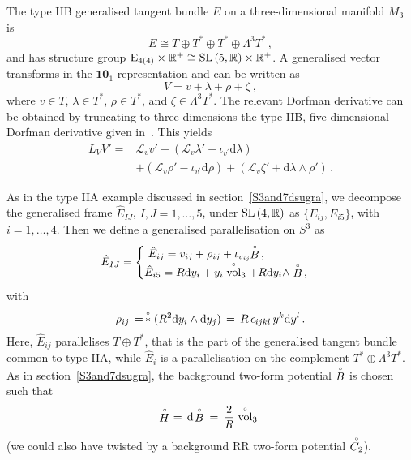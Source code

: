 \documentclass[debug]{phd}
\begin{document}
The type IIB generalised tangent bundle $E$ on a three-dimensional manifold $M_3$ is
\begin{equation}
\label{gb}
E \cong T \oplus T^* \oplus T^* \oplus \Lambda^3 T^*\, ,
\end{equation}
and has structure group $\mathrm{E}_{4(4)} \times \mathbb{R}^+\cong \mathrm{SL}\left(5,\mathbb{R}\right)\times \mathbb{R}^+$.
A generalised vector transforms in the $\mathbf{10}_1$ representation and can be written as
\begin{equation*}
V = v + \lambda + \rho + \zeta\ ,
\end{equation*}
where $v\in T$, $\lambda \in T^*$, $\rho \in T^*$, and $\zeta\in \Lambda^3 T^*$.
The relevant Dorfman derivative can be obtained by truncating to three dimensions the type IIB, five-dimensional Dorfman derivative given in~\cite{spheres,AshmoreECY}. This yields
\begin{equation}
\label{dorfb3}
\begin{split}
L_V V' =& \mathcal{L}_v v' + \left(\mathcal{L}_v \lambda' - \iota_{v^\prime} \mathrm{d}\lambda \right) \\
& + \left(\mathcal{L}_v \rho' - \iota_{v^\prime} \mathrm{d}\rho \right) + \left(\mathcal{L}_v \zeta' + \mathrm{d}\lambda \wedge \rho'\right)\, .
\end{split}
\end{equation}

As in the type IIA example discussed in section~\ref{S3and7dsugra}, we decompose the generalised frame $\hat{E}_{IJ}$, $I,J =1,\ldots, 5$, under $\mathrm{SL}\left(4,\mathbb{R}\right)$ as $\{E_{ij} , E_{i5}\}$, with  $i=1,\ldots,4$.
Then we define a generalised parallelisation on $S^3$ as
\begin{equation}
\label{glpb}
\hat{E}_{IJ} = \begin{cases}\  \hat{E}_{ij} = v_{ij} + \rho_{ij} + \iota_{v_{ij}}\!\! \stackrel{\scriptscriptstyle{\circ}}{B}\, ,\\
\hat{E}_{i5} = R \mathrm{d} y_i + y_i \stackrel{\scriptscriptstyle{\circ}}{\operatorname{vol}}_3 + R \mathrm{d} y_i \wedge \stackrel{\scriptscriptstyle{\circ}}{B} \, , \end{cases}
\end{equation}
with
\begin{equation}
\rho_{ij} \,=\, \stackrel{\scriptscriptstyle{\circ}}{*}(R^2 \mathrm{d} y_i \wedge\mathrm{d} y_j)   \,=\, R\, \epsilon_{ijkl}\, y^k\mathrm{d}y^l \, .
\end{equation}
Here, $\hat{E}_{ij}$ parallelises $T \oplus T^*$, that is the part of the generalised tangent bundle common to type IIA, while $\hat{E}_i$ is a parallelisation on the complement $T^* \oplus \Lambda^3 T^*$.
As in section~\ref{S3and7dsugra}, the background two-form potential $\stackrel{\scriptscriptstyle{\circ}}{B}$ is chosen such that 
\begin{equation}
\stackrel{\scriptscriptstyle{\circ}}{H} \ =\, \mathrm{d}\! \stackrel{\scriptscriptstyle{\circ}}{B}\, \ = \, \frac{2}{R}\stackrel{\scriptscriptstyle{\circ}}{\operatorname{vol}}_3\ 
\end{equation}
(we could also have twisted by a background RR two-form potential $\stackrel{\scriptscriptstyle{\circ}}{C_2}$).
\end{document}
